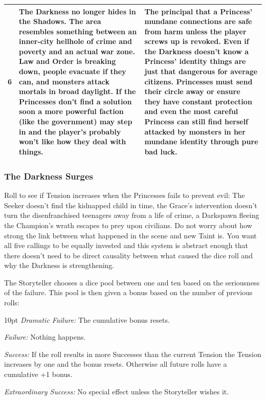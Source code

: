 \begin{tabularx}{\linewidth}{|c|X|X|}
		6 & The Darkness no longer hides in the Shadows. The area resembles something between an inner-city hellhole of crime and poverty and an actual war zone. Law and Order is breaking down, people evacuate if they can, and monsters attack mortals in broad daylight. If the Princesses don't find a solution soon a more powerful faction (like the government) may step in and the player's probably won't like how they deal with things. & The principal that a Princess' mundane connections are safe from harm unless the player screws up is revoked. Even if the Darkness doesn't know a Princess' identity things are just that dangerous for average citizens. Princesses must send their circle away or ensure they have constant protection and even the most careful Princess can still find herself attacked by monsters in her mundane identity through pure bad luck.\\ 
        \hline
    \end{tabularx}

\subsubsection*{The Darkness Surges}

Roll to see if Tension increases when the Princesses fails to prevent evil: The Seeker doesn’t find the kidnapped child in time, the Grace’s intervention doesn’t turn the disenfranchised teenagers away from a life of crime, a Darkspawn fleeing the Champion’s wrath escapes to prey upon civilians. Do not worry about how strong the link between what happened in the scene and new Taint is. You want all five callings to be equally invested and this system is abstract enough that there doesn’t need to be direct causality between what caused the dice roll and why the Darkness is strengthening. 

The Storyteller chooses a dice pool between one and ten based on the seriousness of the failure. This pool is then given a bonus based on the number of previous rolls: 

\begin{myindentpar}{10pt}
    \emph{Dramatic Failure:} The cumulative bonus resets. 
    
    \emph{Failure:} Nothing happens. 
    
    \emph{Success:} If the roll results in more Successes than the current Tension the Tension increases by one and the bonus resets. Otherwise all future rolls have a cumulative +1 bonus. 
    
    \emph{Extraordinary Success:} No special effect unless the Storyteller wishes it. 
\end{myindentpar}

